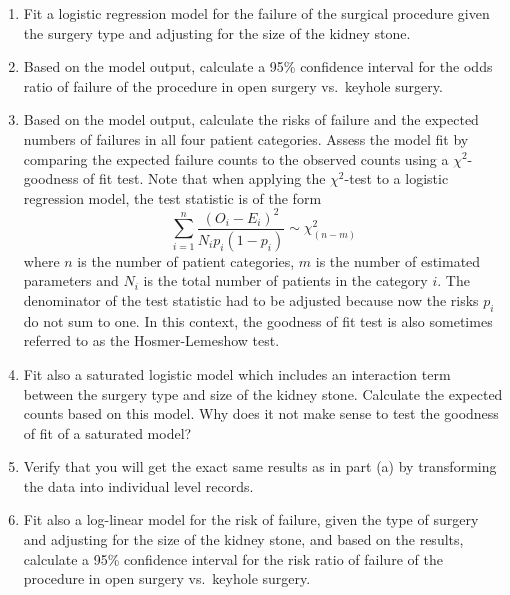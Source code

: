 \documentclass[letterpaper,9pt,twoside,printwatermark=false]{pinp}
\providecommand{\tightlist}{%
  \setlength{\itemsep}{0pt}\setlength{\parskip}{0pt}}
\begin{document}
\begin{enumerate}
\def\labelenumi{\alph{enumi}.}
\tightlist
\item
  Fit a logistic regression model for the failure of the surgical
  procedure given the surgery type and adjusting for the size of the
  kidney stone.
\item
  Based on the model output, calculate a 95\% confidence interval for
  the odds ratio of failure of the procedure in open surgery vs.~keyhole
  surgery.
\item
  Based on the model output, calculate the risks of failure and the
  expected numbers of failures in all four patient categories. Assess
  the model fit by comparing the expected failure counts to the observed
  counts using a \(\chi^2\)-goodness of fit test. Note that when
  applying the \(\chi^2\)-test to a logistic regression model, the test
  statistic is of the form \[
  \sum_{i=1}^n \frac{(O_i - E_i)^2}{N_i p_i (1-p_i)} \sim \chi^2_{(n-m)}
  \] where \(n\) is the number of patient categories, \(m\) is the
  number of estimated parameters and \(N_i\) is the total number of
  patients in the category \(i\). The denominator of the test statistic
  had to be adjusted because now the risks \(p_i\) do not sum to one. In
  this context, the goodness of fit test is also sometimes referred to
  as the Hosmer-Lemeshow test.\\
\item
  Fit also a saturated logistic model which includes an interaction term
  between the surgery type and size of the kidney stone. Calculate the
  expected counts based on this model. Why does it not make sense to
  test the goodness of fit of a saturated model?
\item
  Verify that you will get the exact same results as in part (a) by
  transforming the data into individual level records.
\item
  Fit also a log-linear model for the risk of failure, given the type of
  surgery and adjusting for the size of the kidney stone, and based on
  the results, calculate a 95\% confidence interval for the risk ratio
  of failure of the procedure in open surgery vs.~keyhole surgery.
\end{enumerate}





\end{document}
